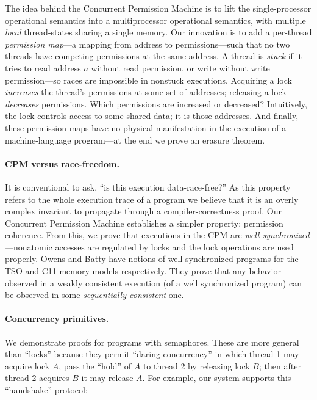 The idea behind the Concurrent Permission Machine is to lift the single-processor operational semantics into a
multiprocessor operational semantics, with multiple \emph{local}
thread-states sharing a single memory.
Our innovation is to add a
per-thread
\emph{permission map}---a mapping from address to permissions---such
that no two threads have competing permissions at the same address.
A thread is \emph{stuck} if it tries to read address $a$ without read permission,
or write without write permission---so races are impossible in nonstuck executions.
Acquiring a lock \emph{increases}
the thread's permissions at some set of addresses; releasing a lock
\emph{decreases} permissions.  Which permissions are increased or
decreased?  Intuitively, the lock controls access to some shared
data; it is those addresses.
And finally, these permission maps have no physical manifestation in the
execution of a machine-language program---at the end we prove an
erasure theorem.

\paragraph{CPM versus race-freedom.}  It is conventional to ask, ``is
this execution data-race-free?''  As this property refers to the whole
execution trace of a program we believe that it is an overly complex
invariant to propagate through a compiler-correctness proof.  Our
Concurrent Permission Machine establishes a simpler property:
permission coherence.  From this, we prove that executions in the CPM
are \emph{well synchronized}---nonatomic accesses are regulated by
locks and the lock operations are used properly. Owens \cite[Theorem
2]{owens10:ecoop} and Batty \cite[pg. 178, Theorem 13]{Batty:PhD} have
notions of well synchronized programs for the TSO and C11 memory
models respectively.  They prove that any behavior observed in a weakly 
consistent execution (of a well synchronized program) can be observed 
in some \emph{sequentially consistent} one.

\paragraph{Concurrency primitives.} 
We demonstrate proofs for programs with semaphores.  
These are more general than
``locks'' because they permit ``daring concurrency''
\cite{ohearn07:tcs}
in which thread 1 may acquire lock $A$, pass the ``hold'' of $A$
to thread 2 by releasing lock $B$; then after thread 2 acquires $B$
it may release $A$.  For example, our system supports this ``handshake''
protocol:

